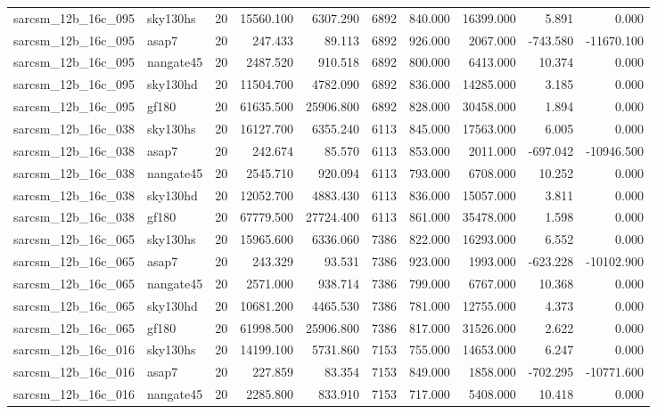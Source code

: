 \documentclass{article}
\begin{document}
\begin{longtable}{llrrrrrrrr}
sarcsm\_12b\_16c\_095 & sky130hs & 20 & 15560.100 & 6307.290 & 6892 & 840.000 & 16399.000 & 5.891 & 0.000 \\
sarcsm\_12b\_16c\_095 & asap7 & 20 & 247.433 & 89.113 & 6892 & 926.000 & 2067.000 & -743.580 & -11670.100 \\
sarcsm\_12b\_16c\_095 & nangate45 & 20 & 2487.520 & 910.518 & 6892 & 800.000 & 6413.000 & 10.374 & 0.000 \\
sarcsm\_12b\_16c\_095 & sky130hd & 20 & 11504.700 & 4782.090 & 6892 & 836.000 & 14285.000 & 3.185 & 0.000 \\
sarcsm\_12b\_16c\_095 & gf180 & 20 & 61635.500 & 25906.800 & 6892 & 828.000 & 30458.000 & 1.894 & 0.000 \\
sarcsm\_12b\_16c\_038 & sky130hs & 20 & 16127.700 & 6355.240 & 6113 & 845.000 & 17563.000 & 6.005 & 0.000 \\
sarcsm\_12b\_16c\_038 & asap7 & 20 & 242.674 & 85.570 & 6113 & 853.000 & 2011.000 & -697.042 & -10946.500 \\
sarcsm\_12b\_16c\_038 & nangate45 & 20 & 2545.710 & 920.094 & 6113 & 793.000 & 6708.000 & 10.252 & 0.000 \\
sarcsm\_12b\_16c\_038 & sky130hd & 20 & 12052.700 & 4883.430 & 6113 & 836.000 & 15057.000 & 3.811 & 0.000 \\
sarcsm\_12b\_16c\_038 & gf180 & 20 & 67779.500 & 27724.400 & 6113 & 861.000 & 35478.000 & 1.598 & 0.000 \\
sarcsm\_12b\_16c\_065 & sky130hs & 20 & 15965.600 & 6336.060 & 7386 & 822.000 & 16293.000 & 6.552 & 0.000 \\
sarcsm\_12b\_16c\_065 & asap7 & 20 & 243.329 & 93.531 & 7386 & 923.000 & 1993.000 & -623.228 & -10102.900 \\
sarcsm\_12b\_16c\_065 & nangate45 & 20 & 2571.000 & 938.714 & 7386 & 799.000 & 6767.000 & 10.368 & 0.000 \\
sarcsm\_12b\_16c\_065 & sky130hd & 20 & 10681.200 & 4465.530 & 7386 & 781.000 & 12755.000 & 4.373 & 0.000 \\
sarcsm\_12b\_16c\_065 & gf180 & 20 & 61998.500 & 25906.800 & 7386 & 817.000 & 31526.000 & 2.622 & 0.000 \\
sarcsm\_12b\_16c\_016 & sky130hs & 20 & 14199.100 & 5731.860 & 7153 & 755.000 & 14653.000 & 6.247 & 0.000 \\
sarcsm\_12b\_16c\_016 & asap7 & 20 & 227.859 & 83.354 & 7153 & 849.000 & 1858.000 & -702.295 & -10771.600 \\
sarcsm\_12b\_16c\_016 & nangate45 & 20 & 2285.800 & 833.910 & 7153 & 717.000 & 5408.000 & 10.418 & 0.000 \\

\end{longtable}
\end{document}
